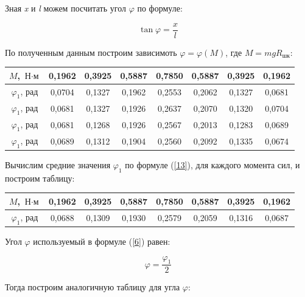 \documentclass[12pt,a4paper]{article}
\begin{document}
\vspace{0,5cm}

Зная \textit{x} и \textit{l} можем посчитать угол $\varphi$ по формуле:

\[ \tan \varphi = \frac{x}{l}\]

По полученным данным построим зависимоть $\varphi = \varphi(\textit{M})$, где $ \textit{M} = \textit{mg}\textit{R}_{\text{шк}}$:

\vspace{0,5cm}

\begin{tabular}{|c|c|c|c|c|c|c|c|}
\hline
$M$, $\text{Н} \cdot \text{м}$ & 0,1962 & 0,3925 & 0,5887 & 0,7850 & 0,5887 & 0,3925 & 0,1962 \\
\hline
$\varphi_1$, рад& 0,0704 & 0,1327 & 0,1962 & 0,2553 & 0,2062 & 0,1327 & 0,0681 \\
\hline
$\varphi_1$, рад& 0,0681 & 0,1327 & 0,1926 & 0,2637 & 0,2070 & 0,1320 & 0,0704 \\
\hline
$\varphi_1$, рад& 0,0681 & 0,1268 & 0,1926 & 0,2567 & 0,2013 & 0,1283 & 0,0689 \\
\hline
$\varphi_1$, рад& 0,0689 & 0,1312 & 0,1904 & 0,2560 & 0,2092 & 0,1335 & 0,0674 \\
\hline
\end{tabular}

\vspace{0,5cm}

Вычислим средние значения $\varphi_1$ по формуле (\ref{13}), для каждого момента сил, и построим таблицу:

\vspace{0,5cm}

\begin{tabular}{|c|c|c|c|c|c|c|c|}
\hline
$M$, $\text{Н} \cdot \text{м}$ & 0,1962 & 0,3925 & 0,5887 & 0,7850 & 0,5887 & 0,3925 & 0,1962 \\
\hline
$\varphi_1$, рад& 0,0688 & 0,1309 & 0,1930 & 0,2579 & 0,2059 & 0,1316 & 0,0687 \\
\hline
\end{tabular}

\vspace{0,5cm}

Угол $\varphi$ используемый в формуле (\ref{6}) равен:

\[\varphi = \frac{\varphi_1}{2}\]

Тогда построим аналогичную таблицу для угла $\varphi$:

\vspace{0,5cm}
\end{document}

